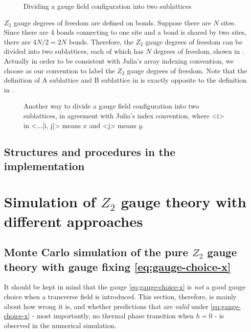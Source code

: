 \documentclass[hyperref, a4paper]{article}
\newcommand*{\Ztwo}{\texorpdfstring{$\mathbb{Z}_2$ }{Z2 }}
\def\texttt#1{<#1>}%
\def\mathbb#1{#1}%
\begin{document}
\begin{figure}
    \centering
    
    \caption{Dividing a gauge field configuration into two sublattices}
    \label{fig:z2-dividing}
\end{figure}

\Ztwo gauge degrees of freedom are defined on bonds. 
Suppose there are $N$ sites. Since there are 4 bonds connecting to one site and a bond is shared by two sites,
there are $4 N / 2 = 2 N$ bonds.
Therefore, the \Ztwo gauge degrees of freedom can be divided into two sublattices, each of which has $N$ degrees of freedom, shown in .
Actually in order to be consistent with Julia's array indexing convention, we choose  as our convention to label the \Ztwo gauge degrees of freedom.
Note that the definition of A sublattice and B sublattice in  is exactly opposite to the definition in .

\begin{figure}
    \centering
    
    \caption{Another way to divide a gauge field configuration into two sublattices, in agreement with Julia's index convention, where \texttt{i} in \texttt{...[i, j]} means $x$ and \texttt{j} means $y$.}
    \label{fig:z2-dividing-real}
\end{figure}

\subsection{Structures and procedures in the implementation}



\section{Simulation of \Ztwo gauge theory with different approaches}

\subsection{Monte Carlo simulation of the pure \Ztwo gauge theory with gauge fixing \eqref{eq:gauge-choice-x}}

It should be kept in mind that the gauge \eqref{eq:gauge-choice-x} is \emph{not} a good gauge choice when a transverse field is introduced.
This section, therefore, is mainly about how wrong it is, and whether predictions that are \emph{valid} under \eqref{eq:gauge-choice-x} - most importantly, no thermal phase transition when $h=0$ - is observed in the numerical simulation.
\end{document}
